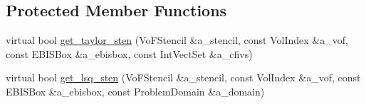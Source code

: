 \subsection*{Protected Member Functions}
\begin{DoxyCompactItemize}
\item 
virtual bool \hyperlink{classrobinconductivityebbc_a6bc2d7e03b24e3f14e45f4456e1c4e94}{get\+\_\+taylor\+\_\+sten} (Vo\+F\+Stencil \&a\+\_\+stencil, const Vol\+Index \&a\+\_\+vof, const E\+B\+I\+S\+Box \&a\+\_\+ebisbox, const Int\+Vect\+Set \&a\+\_\+cfivs)
\item 
virtual bool \hyperlink{classrobinconductivityebbc_aa5f7ed65d6eacd7d3f51d1e5568b7bac}{get\+\_\+lsq\+\_\+sten} (Vo\+F\+Stencil \&a\+\_\+stencil, const Vol\+Index \&a\+\_\+vof, const E\+B\+I\+S\+Box \&a\+\_\+ebisbox, const Problem\+Domain \&a\+\_\+domain)
\end{DoxyCompactItemize}
